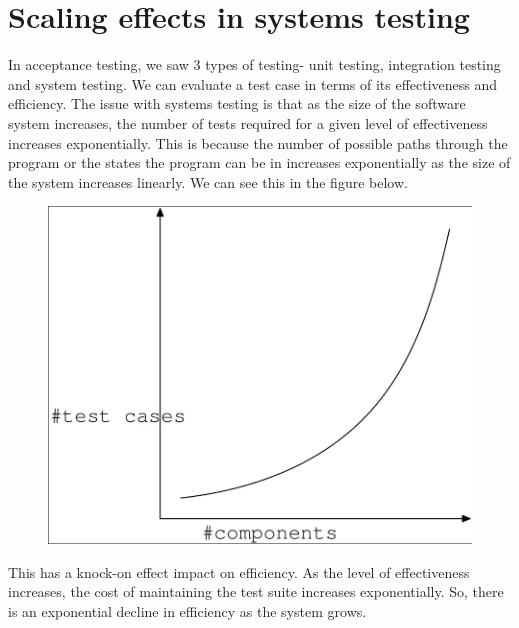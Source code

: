 \documentclass[a4paper, openany]{memoir}
\begin{document}
\section{Scaling effects in systems testing}
In acceptance testing, we saw 3 types of testing- unit testing, integration testing and system testing. We can evaluate a test case in terms of its effectiveness and efficiency. The issue with systems testing is that as the size of the software system increases, the number of tests required for a given level of effectiveness increases exponentially. This is because the number of possible paths through the program or the states the program can be in increases exponentially as the size of the system increases linearly. We can see this in the figure below.
\begin{figure}[H]
    \centering
    \includegraphics[scale=0.3]{src/13 components v test cases.png}
\end{figure}
\noindent This has a knock-on effect impact on efficiency. As the level of effectiveness increases, the cost of maintaining the test suite increases exponentially. So, there is an exponential decline in efficiency as the system grows.
\end{document}
